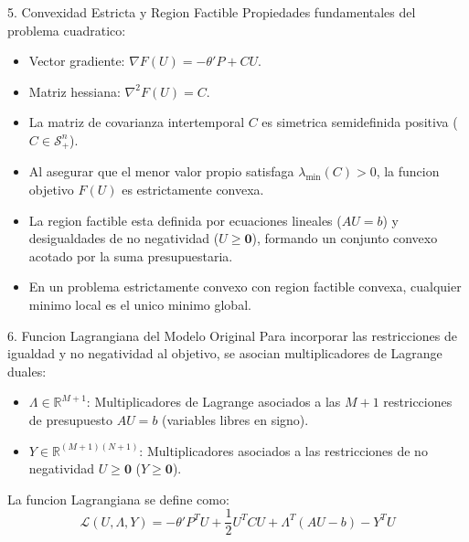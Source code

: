 \documentclass[aspectratio=169,10pt]{beamer}
\begin{document}
\begin{frame}{5. Convexidad Estricta y Region Factible}
  Propiedades fundamentales del problema cuadratico:
  \vspace{0.3cm}
  \begin{itemize}
    \item Vector gradiente: $\nabla F(U) = -\theta' P + C U$.
    \vspace{0.1cm}
    \item Matriz hessiana: $\nabla^2 F(U) = C$.
    \vspace{0.1cm}
    \item La matriz de covarianza intertemporal $C$ es simetrica semidefinida positiva ($C \in \mathcal{S}_+^n$).
    \vspace{0.2cm}
    \item Al asegurar que el menor valor propio satisfaga $\lambda_{\min}(C) > 0$, la funcion objetivo $F(U)$ es estrictamente convexa.
    \vspace{0.2cm}
    \item La region factible esta definida por ecuaciones lineales ($AU = b$) y desigualdades de no negatividad ($U \ge \mathbf{0}$), formando un conjunto convexo acotado por la suma presupuestaria.
    \vspace{0.2cm}
    \item En un problema estrictamente convexo con region factible convexa, cualquier minimo local es el unico minimo global.
  \end{itemize}
\end{frame}

\begin{frame}{6. Funcion Lagrangiana del Modelo Original}
  Para incorporar las restricciones de igualdad y no negatividad al objetivo, se asocian multiplicadores de Lagrange duales:
  \vspace{0.3cm}
  \begin{itemize}
    \item $\Lambda \in \mathbb{R}^{M+1}$: Multiplicadores de Lagrange asociados a las $M+1$ restricciones de presupuesto $AU = b$ (variables libres en signo).
    \vspace{0.2cm}
    \item $Y \in \mathbb{R}^{(M+1)(N+1)}$: Multiplicadores asociados a las restricciones de no negatividad $U \ge \mathbf{0}$ ($Y \ge \mathbf{0}$).
  \end{itemize}
  \vspace{0.3cm}
  La funcion Lagrangiana se define como:
  \vspace{0.2cm}
  \begin{equation*}
    \mathcal{L}(U, \Lambda, Y) = -\theta' P^T U + \frac{1}{2} U^T C U + \Lambda^T (AU - b) - Y^T U
  \end{equation*}
\end{frame}
\end{document}
